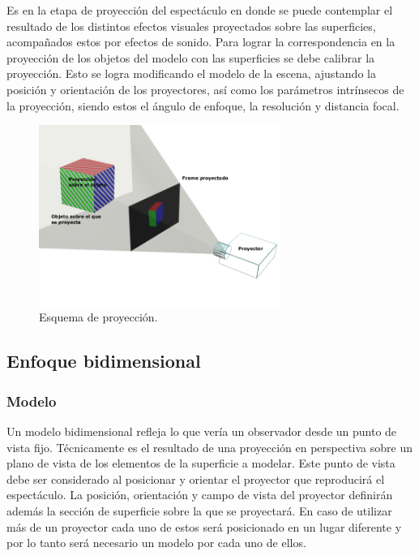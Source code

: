 Es en la etapa de proyección del espectáculo en donde se puede contemplar el resultado de los distintos efectos visuales proyectados sobre las superficies, acompañados estos por efectos de sonido. Para lograr la correspondencia en la proyección de los objetos del modelo con las superficies se debe calibrar la proyección.
Esto se logra modificando el modelo de la escena, ajustando la posición y orientación de los proyectores, así como los parámetros intrínsecos de la proyección, siendo estos el ángulo de enfoque, la resolución y distancia focal.

\begin{figure}[H]
  \centering
    \includegraphics[width=0.7\textwidth]{./Cap2_videomapping/proy2dvs3d}
  \caption[Imagen propia]{Esquema de proyección.}
  \label{fig:proy2dvs3d}
\end{figure}

\subsection{Enfoque bidimensional}
\subsubsection{Modelo}
Un modelo bidimensional refleja lo que vería un observador desde un punto de vista fijo.
Técnicamente es el resultado de una proyección en perspectiva \cite{LibroCompGrafica} sobre un plano de vista de los elementos de la superficie a modelar.
Este punto de vista debe ser considerado al posicionar y orientar el proyector que reproducirá el espectáculo.
La posición, orientación y campo de vista del proyector definirán además la sección de superficie sobre la que se proyectará.
En caso de utilizar más de un proyector cada uno de estos será posicionado en un lugar diferente y por lo tanto será necesario un modelo por cada uno de ellos.

